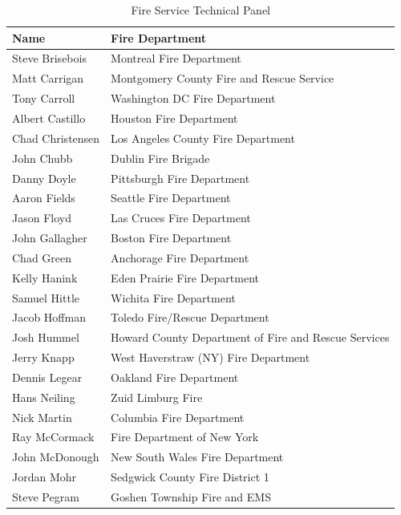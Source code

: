 \documentclass{book}
\begin{document}
\begin{table}[H]
	\centering
	\caption*{Fire Service Technical Panel}
	\begin{tabular}{ll}
		\toprule[1.5pt]
		Name & Fire Department \\ 
		\midrule
		Steve Brisebois  & Montreal Fire Department \\ 
		Matt Carrigan    & Montgomery County Fire and Rescue Service \\ 
		Tony Carroll     & Washington DC Fire Department \\ 
		Albert Castillo  & Houston Fire Department \\ 
		Chad Christensen & Los Angeles County Fire Department \\ 
		John Chubb       & Dublin Fire Brigade \\ 		 		  
		Danny Doyle      & Pittsburgh Fire Department \\ 
		Aaron Fields     & Seattle Fire Department \\ 
		Jason Floyd      & Las Cruces Fire Department \\ 
		John Gallagher   & Boston Fire Department \\ 
		Chad Green       & Anchorage Fire Department \\ 
		Kelly Hanink     & Eden Prairie Fire Department \\ 
		Samuel Hittle    & Wichita Fire Department \\ 
		Jacob Hoffman    & Toledo Fire/Rescue Department \\ 
		Josh Hummel      & Howard County Department of Fire and Rescue Services \\ 
		Jerry Knapp      & West Haverstraw (NY) Fire Department \\ 
		Dennis Legear    & Oakland Fire Department \\ 
		Hans Neiling     & Zuid Limburg Fire \\ 
		Nick Martin      & Columbia Fire Department \\ 
		Ray McCormack    & Fire Department of New York \\ 
		John McDonough   & New South Wales Fire Department \\ 
		Jordan Mohr      & Sedgwick County Fire District 1 \\ 
		Steve Pegram     & Goshen Township Fire and EMS \\ 
		\bottomrule[1.25pt]
	\end{tabular}
\end{table}
\end{document}
